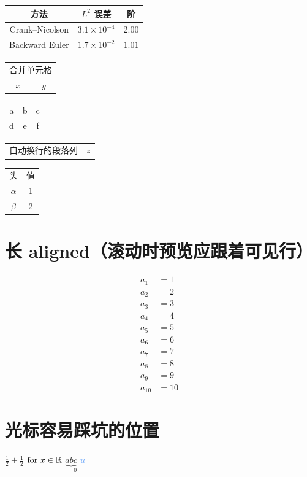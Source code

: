 \documentclass{silkmath-fixture}
\begin{document}
\begin{tabular}{cc|c}
  \toprule
  方法 & $L^2$ 误差 & 阶 \\
  \midrule
  Crank--Nicolson & $3.1\times 10^{-4}$ & $2.00$ \\
  Backward Euler & $1.7\times 10^{-2}$ & $1.01$ \\
  \bottomrule
\end{tabular}

\begin{tabular}{cc}
  \multicolumn{2}{c}{合并单元格} \\
  $x$ & $y$
\end{tabular}

\begin{tabular}{*{3}{c}}
  a & b & c \\
  d & e & f
\end{tabular}

\begin{tabular}{p{3cm}c}
  自动换行的段落列 & $z$
\end{tabular}

\begin{longtable}{cc}
  头 & 值 \\
  $\alpha$ & 1 \\
  $\beta$ & 2
\end{longtable}

\section{长 aligned（滚动时预览应跟着可见行）}

\begin{align}
  a_1 &= 1 \\
  a_2 &= 2 \\
  a_3 &= 3 \\
  a_4 &= 4 \\
  a_5 &= 5 \\
  a_6 &= 6 \\
  a_7 &= 7 \\
  a_8 &= 8 \\
  a_9 &= 9 \\
  a_{10} &= 10
\end{align}

\section{光标容易踩坑的位置}

$\frac12+\frac1{2}$
$\text{for } x\in\mathbb{R}$
$\underbrace{abc}_{=0}$
$\textcolor{Accent}{u}$
\end{document}
